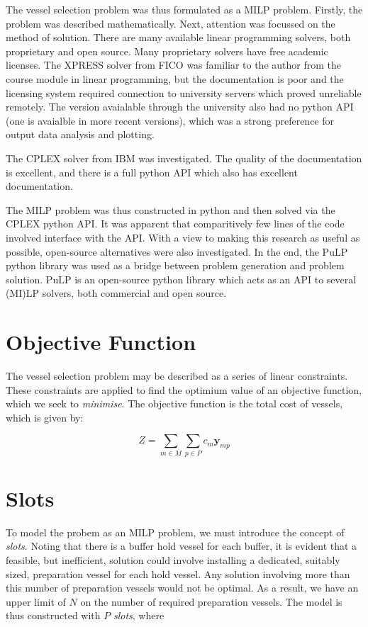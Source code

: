 The vessel selection problem was thus formulated as a MILP problem.
Firstly, the problem was described mathematically.
Next, attention was focussed on the method of solution.  
There are many available linear programming solvers, both proprietary and open
source.
Many proprietary solvers have free academic licenses.
The XPRESS solver from FICO was familiar to the author from the course module
in linear programming, but the documentation is poor and the licensing system
required connection to university servers which proved unreliable remotely.
The version avaialable through the university also had no python API (one is
avaialble in more recent versions), which was a strong preference for output
data analysis and plotting.

The CPLEX solver from IBM was investigated.  
The quality of the documentation is excellent, and there is a full python API
which also has excellent documentation.

The MILP problem was thus constructed in python and then solved via the CPLEX
python API.
It was apparent that comparitively few lines of the code involved interface
with the API.
With a view to making this research as useful as possible, open-source
alternatives were also investigated.
In the end, the PuLP python library was used as a bridge between problem
generation and problem solution.
PuLP is an open-source python library which acts as an API to several
(MI)LP solvers, both commercial and open source.

\section{Objective Function}\label{S.objfn}

The vessel selection problem may be described as a series of linear constraints.
These constraints are applied to find the optimium value of an objective
function, which we seek to \emph{minimise}.
The objective function is the total cost of vessels, which is given by:

\begin{equation}
    Z = \sum_{m \in M} \sum_{p \in P} c_m \boldsymbol{y}_{mp}
\end{equation}

\section{Slots}\label{S.slots}

To model the probem as an MILP problem, we must introduce the concept of
\emph{slots}.
Noting that there is a buffer hold vessel for each buffer, it is evident that 
a feasible, but inefficient, solution could involve installing a dedicated,
suitably sized, preparation vessel for each hold vessel.  
Any solution involving more than this number of preparation vessels would not
be optimal.
As a result, we have an upper limit of $N$ on the number of required
preparation vessels.
The model is thus constructed with $P$ \emph{slots}, where

